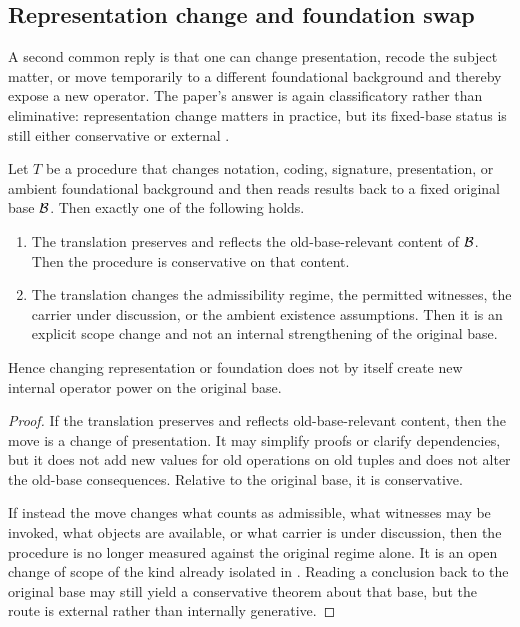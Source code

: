 \subsection{Representation change and foundation swap}

A second common reply is that one can change presentation, recode the subject matter, or move temporarily to a different foundational background and thereby expose a new operator. The paper's answer is again classificatory rather than eliminative: representation change matters in practice, but its fixed-base status is still either conservative or external \citep{ChangKeisler1990,BarrettHalvorson2016,MacLane1998,Simpson2009}.

\begin{proposition}\label{prop:representation-change}
Let $T$ be a procedure that changes notation, coding, signature, presentation, or ambient foundational background and then reads results back to a fixed original base $\mathcal{B}$. Then exactly one of the following holds.
\begin{enumerate}[label=(\alph*)]
    \item The translation preserves and reflects the old-base-relevant content of $\mathcal{B}$. Then the procedure is conservative on that content.
    \item The translation changes the admissibility regime, the permitted witnesses, the carrier under discussion, or the ambient existence assumptions. Then it is an explicit scope change and not an internal strengthening of the original base.
\end{enumerate}
Hence changing representation or foundation does not by itself create new internal operator power on the original base.
\end{proposition}

\begin{proof}
If the translation preserves and reflects old-base-relevant content, then the move is a change of presentation. It may simplify proofs or clarify dependencies, but it does not add new values for old operations on old tuples and does not alter the old-base consequences. Relative to the original base, it is conservative.

If instead the move changes what counts as admissible, what witnesses may be invoked, what objects are available, or what carrier is under discussion, then the procedure is no longer measured against the original regime alone. It is an open change of scope of the kind already isolated in . Reading a conclusion back to the original base may still yield a conservative theorem about that base, but the route is external rather than internally generative.
\end{proof}

